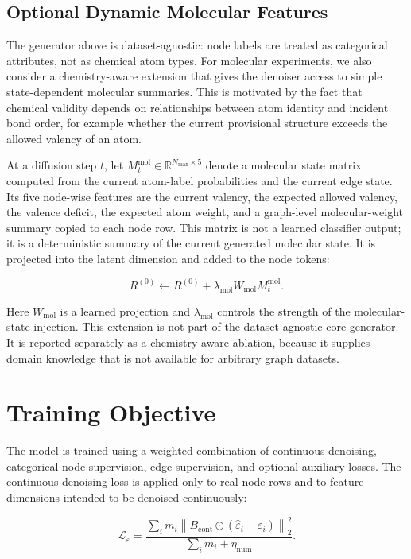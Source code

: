 \subsection{Optional Dynamic Molecular Features}
\label{sec:generator:dynamic-molecular}

The generator above is dataset-agnostic: node labels are treated as categorical
attributes, not as chemical atom types. For molecular experiments, we also
consider a chemistry-aware extension that gives the denoiser access to simple
state-dependent molecular summaries. This is motivated by the fact that
chemical validity depends on relationships between atom identity and incident
bond order, for example whether the current provisional structure exceeds the
allowed valency of an atom.

At a diffusion step \(t\), let \(M_t^{\mathrm{mol}}\in
\mathbb{R}^{N_{\max}\times 5}\) denote a molecular state matrix computed from
the current atom-label probabilities and the current edge state. Its five
node-wise features are the current valency, the expected allowed valency, the
valence deficit, the expected atom weight, and a graph-level molecular-weight
summary copied to each node row. This matrix is not a learned classifier
output; it is a deterministic summary of the current generated molecular state.
It is projected into the latent dimension and added to the node tokens:

\[
    R^{(0)}
    \leftarrow
    R^{(0)}
    + \lambda_{\mathrm{mol}} W_{\mathrm{mol}} M_t^{\mathrm{mol}}.
\]

Here \(W_{\mathrm{mol}}\) is a learned projection and
\(\lambda_{\mathrm{mol}}\) controls the strength of the molecular-state
injection. This extension is not part of the dataset-agnostic core generator.
It is reported separately as a chemistry-aware ablation, because it supplies
domain knowledge that is not available for arbitrary graph datasets.

\section{Training Objective}
\label{sec:generator:objective}

The model is trained using a weighted combination of continuous denoising,
categorical node supervision, edge supervision, and optional auxiliary losses.
The continuous denoising loss is applied only to real node rows and to feature
dimensions intended to be denoised continuously:

\[
    \mathcal{L}_{\varepsilon}
    =
    \frac{
        \sum_i m_i
        \left\|
            B_{\mathrm{cont}}
            \odot
            (\hat{\varepsilon}_i - \varepsilon_i)
        \right\|_2^2
    }{
        \sum_i m_i + \eta_{\mathrm{num}}
    }.
\]

